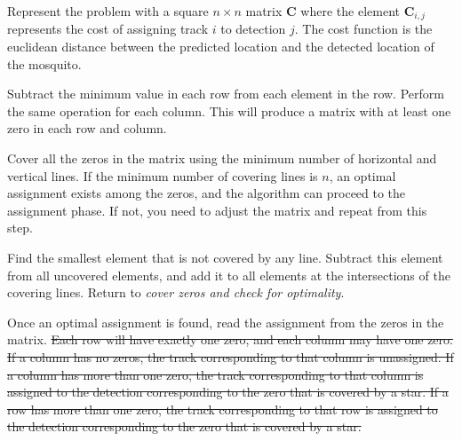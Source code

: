 \begin{description}[style=nextline]
    \item[Generate a cost matrix.] Represent the problem with a square $n \times n$ matrix $\mathbf{C}$ where the element $\mathbf{C}_{i,j}$ represents the cost of assigning track $i$ to detection $j$. The cost function is the euclidean distance between the predicted location and the detected location of the mosquito.
    \item[Row and column reduction.] Subtract the minimum value in each row from each element in the row. Perform the same operation for each column. This will produce a matrix with at least one zero in each row and column.
    \item[Cover zeros and check for optimality.] Cover all the zeros in the matrix using the minimum number of horizontal and vertical lines. If the minimum number of covering lines is $n$, an optimal assignment exists among the zeros, and the algorithm can proceed to the assignment phase. If not, you need to adjust the matrix and repeat from this step.
    \item[Adjust the matrix.] Find the smallest element that is not covered by any line. Subtract this element from all uncovered elements, and add it to all elements at the intersections of the covering lines. Return to \textit{cover zeros and check for optimality}.
    \item[Assignment.] Once an optimal assignment is found, read the assignment from the zeros in the matrix. \sout{Each row will have exactly one zero, and each column may have one zero. If a column has no zeros, the track corresponding to that column is unassigned. If a column has more than one zero, the track corresponding to that column is assigned to the detection corresponding to the zero that is covered by a star. If a row has more than one zero, the track corresponding to that row is assigned to the detection corresponding to the zero that is covered by a star.}
\end{description}



